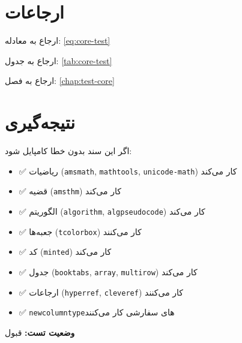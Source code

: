 \documentclass{matinbook}
\begin{document}
\section{ارجاعات}
\label{sec:references}

ارجاع به معادله: \cref{eq:core-test}

ارجاع به جدول: \cref{tab:core-test}

ارجاع به فصل: \cref{chap:test-core}

\section{نتیجه‌گیری}
\label{sec:conclusion}

اگر این سند بدون خطا کامپایل شود:

\begin{itemize}
    \item ✅ ریاضیات (\texttt{amsmath}, \texttt{mathtools}, \texttt{unicode-math}) کار می‌کند
    \item ✅ قضیه (\texttt{amsthm}) کار می‌کند
    \item ✅ الگوریتم (\texttt{algorithm}, \texttt{algpseudocode}) کار می‌کند
    \item ✅ جعبه‌ها (\texttt{tcolorbox}) کار می‌کنند
    \item ✅ کد (\texttt{minted}) کار می‌کند
    \item ✅ جدول (\texttt{booktabs}, \texttt{array}, \texttt{multirow}) کار می‌کند
    \item ✅ ارجاعات (\texttt{hyperref}, \texttt{cleveref}) کار می‌کنند
    \item ✅ \texttt{newcolumntype}های سفارشی کار می‌کنند
\end{itemize}

\textbf{وضعیت تست:} قبول
\end{document}
